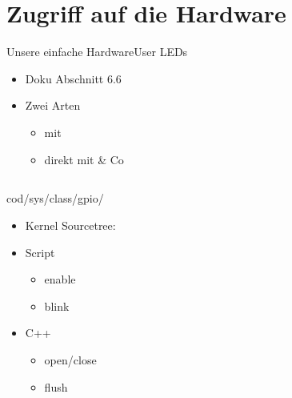 \section{Zugriff auf die Hardware}

\begin{frame}{Unsere einfache Hardware}{User LEDs}
\begin{itemize}
 \item Doku  Abschnitt 6.6
 \item Zwei Arten 
 \begin{itemize}
  \item mit \targetS {}
  \item direkt mit  \& Co
 \end{itemize}
\end{itemize}
\end{frame}

\subsection{}
\begin{frame}{cod{/sys/class/gpio/}}
 \begin{itemize}
  \item Kernel Sourcetree: 
  \item Script
  \begin{itemize}
   \item enable 
   \item blink
  \end{itemize}
  \item C++ 
  \begin{itemize}
   \item open/close
   \item flush
  \end{itemize}
 \end{itemize}
\end{frame}

